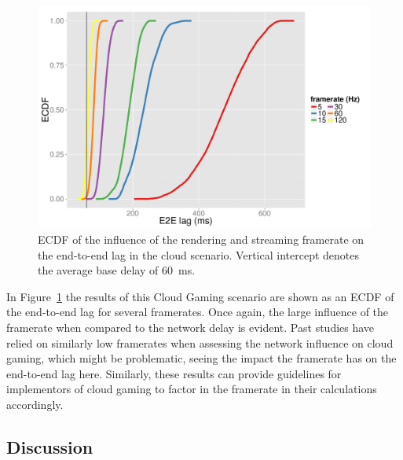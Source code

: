 \begin{figure}[!t]
	\centering
	\includegraphics[width=1.0\columnwidth]{../simulation/visualization/cloudgaming-lag-cdf.pdf}
	\caption{\acrshort{ECDF} of the influence of the rendering and streaming framerate on the end-to-end lag in the cloud scenario. Vertical intercept denotes the average base delay of \SI{60}{\milli\second}.}
\label{fig:cloud-e2e-delay-sim}
\end{figure}

In Figure~\ref{fig:cloud-e2e-delay-sim} the results of this Cloud Gaming scenario are shown as an \gls{ECDF} of the end-to-end lag for several framerates. Once again, the large influence of the framerate when compared to the network delay is evident. Past studies have relied on similarly low framerates when assessing the network influence on cloud gaming, which might be problematic, seeing the impact the framerate has on the end-to-end lag here. 
Similarly, these results can provide guidelines for implementors of cloud gaming to factor in the framerate in their calculations accordingly.


\subsection{Discussion}

